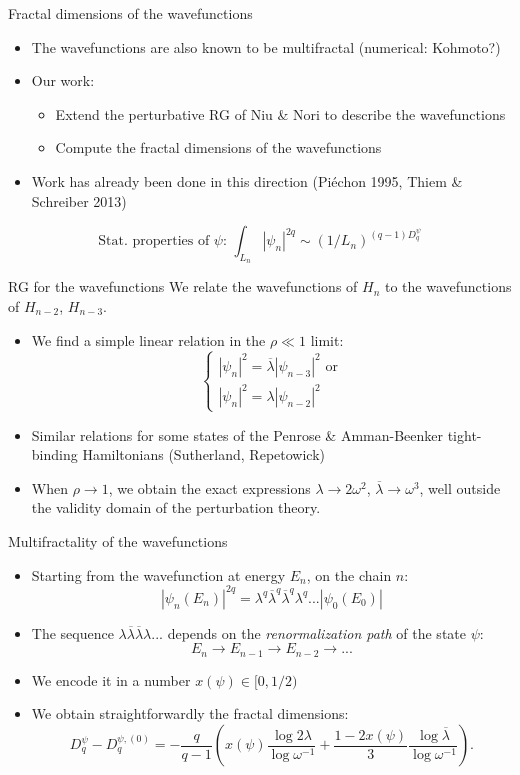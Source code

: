 \documentclass[xcolor=x11names,compress,professionalfonts]{beamer}
\renewcommand{\(}{\begin{columns}}
\renewcommand{\)}{\end{columns}}
\newcommand{\<}[1]{\begin{column}{#1}}
\renewcommand{\>}{\end{column}}
\newcommand{\lb}{\ensuremath{\overline{\lambda}}}
\begin{document}
\begin{frame}{Fractal dimensions of the wavefunctions}
\begin{itemize}
	\item The wavefunctions are also known to be multifractal (numerical: Kohmoto?)
	\item Our work:
	\begin{itemize}
		\item Extend the perturbative RG of Niu \& Nori to describe the wavefunctions
		\item Compute the fractal dimensions of the wavefunctions
	\end{itemize}
	\item Work has already been done in this direction (Piéchon 1995, Thiem \& Schreiber 2013)
\end{itemize}
	\[
	\text{Stat. properties of $\psi$:~} 
	\int_{L_n} |\psi_n|^{2q} \sim (1/L_n)^{(q-1)D_q^\psi} 
	\]
\end{frame}

\begin{frame}{RG for the wavefunctions}
We relate the wavefunctions of $H_n$ to the wavefunctions of $H_{n-2}$, $H_{n-3}$.
\begin{itemize}
	\item We find a simple linear relation in the $\rho \ll 1$ limit: 
	\[
	\begin{cases}
		|\psi_n|^2 = \lb |\psi_{n-3}|^2 \text{~or}\\
		|\psi_n|^2 = \lambda |\psi_{n-2}|^2
	\end{cases}
	\]
	\item Similar relations for some states of the Penrose \& Amman-Beenker tight-binding Hamiltonians (Sutherland, Repetowick)
	\item When $\rho \rightarrow 1$, we obtain the exact expressions $\lambda \rightarrow 2 \omega^2$, $\lb \rightarrow \omega^3$, well outside the validity domain of the perturbation theory.
\end{itemize}
\end{frame}

\begin{frame}{Multifractality of the wavefunctions}
\begin{itemize}
	\item Starting from the wavefunction at energy $E_n$, on the chain $n$:
		\[ |\psi_n(E_n)|^{2q} = \lambda^q \lb^q \lb^q \lambda^q ... |\psi_0(E_0)| \]
	\item The sequence $\lambda \lb \lb \lambda ...$ depends on the \emph{renormalization path} of the state $\psi$:
	\[ E_n \rightarrow E_{n-1} \rightarrow E_{n-2} \rightarrow ... \]
	\item We encode it in a number $x(\psi) \in [0,1/2)$
	\item We obtain straightforwardly the fractal dimensions:
	\[ D_q^\psi - D_q^{\psi,(0)} = - \frac{q}{q-1} \left( x(\psi) \frac{\log 2 \lambda}{\log \omega^{-1}} + \frac{1-2x(\psi)}{3}\frac{\log \lb}{\log \omega^{-1}} \right). \]
\end{itemize}
\end{frame}
\end{document}
